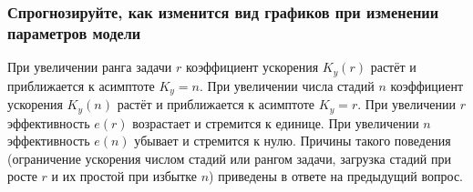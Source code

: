 \subsubsection*{Спрогнозируйте, как изменится вид графиков при изменении параметров модели}

При увеличении ранга задачи $r$ коэффициент ускорения $K_y(r)$ растёт и приближается к асимптоте $K_y = n$. При увеличении числа стадий $n$ коэффициент ускорения $K_y(n)$ растёт и приближается к асимптоте $K_y = r$. При увеличении $r$ эффективность $e(r)$ возрастает и стремится к единице. При увеличении $n$ эффективность $e(n)$ убывает и стремится к нулю. Причины такого поведения (ограничение ускорения числом стадий или рангом задачи, загрузка стадий при росте $r$ и их простой при избытке $n$) приведены в ответе на предыдущий вопрос.
